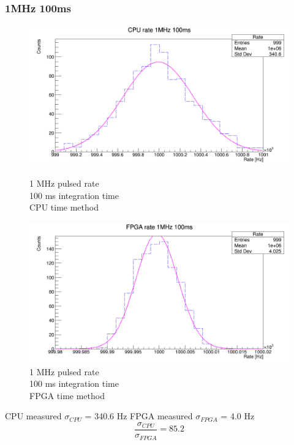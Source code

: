 \subsubsection{1MHz 100ms}
\begin{figure}[H]
	\centering
	\begin{minipage}{0.49\textwidth}
		\centering
		\includegraphics[width=.95\linewidth]{IMG/ch5/RateMeasures/CPU-time-rate-1MHz-100ms}
		\caption{1 MHz pulsed rate\\100 ms integration time\\CPU time method}
		\label{fig:CPU-time-rate-1MHz-100ms}
	\end{minipage}%
	\begin{minipage}{0.49\textwidth}
		\centering
		\includegraphics[width=.95\linewidth]{IMG/ch5/RateMeasures/FPGA-time-rate-1MHz-100ms}
		\caption{1 MHz pulsed rate\\100 ms integration time\\FPGA time method}
		\label{fig:FPGA-time-rate-1MHz-100ms}
	\end{minipage}
\end{figure}
\noindent CPU measured $\sigma_{CPU}$ = 340.6 Hz
\newline
FPGA measured $\sigma_{FPGA}$ = 4.0 Hz
\begin{equation}
	\frac{\sigma_{CPU}}{\sigma_{FPGA}} = 85.2
\end{equation}


